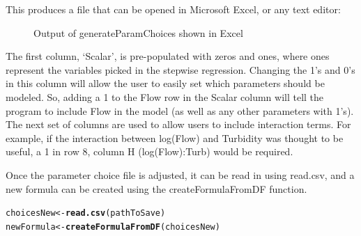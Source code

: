 \documentclass[a4paper,11pt]{article}\usepackage[]{graphicx}\usepackage[]{color}
\makeatletter
\newcommand{\hlkwd}[1]{\textcolor[rgb]{0.737,0.353,0.396}{\textbf{#1}}}%
\newenvironment{kframe}{%
 \def\at@end@of@kframe{}%
 \ifinner\ifhmode%
  \def\at@end@of@kframe{\end{minipage}}%
  \begin{minipage}{\columnwidth}%
 \fi\fi%
 \def\FrameCommand##1{\hskip\@totalleftmargin \hskip-\fboxsep
 \colorbox{shadecolor}{##1}\hskip-\fboxsep
     \hskip-\linewidth \hskip-\@totalleftmargin \hskip\columnwidth}%
 \MakeFramed {\advance\hsize-\width
   \@totalleftmargin\z@ \linewidth\hsize
   \@setminipage}}%
 {\par\unskip\endMakeFramed%
 \at@end@of@kframe}
\newenvironment{knitrout}{}{} %
\makeatother
\begin{document}
\begin{knitrout}
\color{fgcolor}\begin{kframe}


{\ttfamily\noindent\bfseries\color{errorcolor}{Error: object 'modelReturn' not found}}\end{kframe}
\end{knitrout}


This produces a file that can be opened in Microsoft Excel, or any text editor:

\begin{figure}[ht!]
\centering
\caption{Output of generateParamChoices shown in Excel}
\label{overflow}
\end{figure}

The first column, `Scalar', is pre-populated with zeros and ones, where ones represent the variables picked in the stepwise regression. Changing the 1's and 0's in this column will allow the user to easily set which parameters should be modeled. So, adding a 1 to the Flow row in the Scalar column will tell the program to include Flow in the model (as well as any other parameters with 1's). The next set of columns are used to allow users to include interaction terms. For example, if the interaction between log(Flow) and Turbidity was thought to be useful, a 1 in row 8, column H (log(Flow):Turb) would be required.

Once the parameter choice file is adjusted, it can be read in using read.csv, and a new formula can be created using the createFormulaFromDF function.

\begin{knitrout}
\color{fgcolor}\begin{kframe}
\begin{alltt}
choicesNew <- \hlkwd{read.csv}(pathToSave)
newFormula <-\hlkwd{createFormulaFromDF}(choicesNew)
\end{alltt}
\end{kframe}
\end{knitrout}
\end{document}
